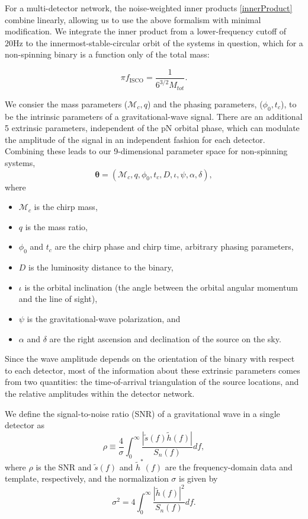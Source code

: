 \documentclass[11pt,a4paper]{emulateapj}
\newcommand{\thpara}{\boldsymbol{\theta}}
\newcommand{\chmass}{\mathcal{M}_c}
\begin{document}
For a multi-detector network, the noise-weighted inner products
\eqref{innerProduct} combine linearly, allowing us to use the above
formalism with minimal modification.  We integrate the inner product
from a lower-frequency cutoff of $20\text{Hz}$ to the
innermost-stable-circular orbit of the systems in question, which for a
non-spinning binary is a function only of the total mass:

\begin{equation}
  \pi f_{\text{ISCO}} = \frac{1}{6^{3/2}M_{tot}}.
  \label{ISCOFrequency}
\end{equation}
   
We consier the mass parameters ($\chmass,q$) and the phasing parameters,
($\phi_0,t_c$), to be the intrinsic parameters of a gravitational-wave signal.  There 
are an additional 5 extrinsic parameters, independent of the pN orbital phase, which can
modulate the amplitude of the signal in an independent fashion for each detector.  
Combining these leads to our 9-dimensional parameter space for non-spinning systems,
\begin{equation}
\thpara =  (\chmass, q, \phi_0,t_c,D,\iota,\psi,\alpha,\delta),
\label{parameterspace}
\end{equation}
where 

\begin{itemize}
\item $\chmass$ is the chirp mass,
\item $q$ is the mass ratio,
\item $\phi_0$ and $t_c$ are the chirp phase and chirp time, arbitrary phasing parameters,
\item $D$ is the luminosity distance to the binary,
\item $\iota$ is the orbital inclination (the angle between the orbital angular momentum and the line of sight), 
\item $\psi$ is the gravitational-wave polarization, and
\item $\alpha$ and $\delta$ are the right ascension and declination of the
source on the sky.
\end{itemize}
  Since the wave amplitude depends on the orientation of the
binary with respect to each detector, most of the information about these extrinsic
parameters comes from two quantities: the time-of-arrival triangulation of 
the source locations, and the relative amplitudes within the detector network.

We define the signal-to-noise ratio (SNR) of a gravitational wave in a
single detector as 
\begin{equation}
  \rho \equiv \frac{4}{\sigma} \int^{\infty}_{0}\frac{| \tilde{s}(f)\tilde{h}(f)|}{S_{n}(f)}df,
  \label{formalSNR}
\end{equation}
where $\rho$ is the SNR and $\tilde s(f)$ and $\tilde{h}^{*}(f)$ are
the frequency-domain data and template, respectively, and the normalization $\sigma$ is
given by
\begin{equation}
  \sigma^2 = 4\int^{\infty}_{0}\frac{| \tilde{h}(f)|^2}{S_n(f)}df.
  \label{SNRnorm}
\end{equation}
\end{document}
